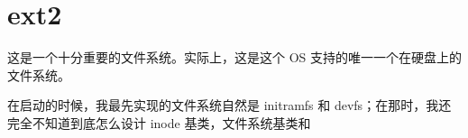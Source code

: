 \section{ext2}
\label{sec:ext2}

这是一个十分重要的文件系统。实际上，这是这个 OS 支持的唯一一个在硬盘上的文件系统。

在启动的时候，我最先实现的文件系统自然是 initramfs 和 devfs；在那时，我还完全不知道到底怎么设计 inode 基类，文件系统基类和
